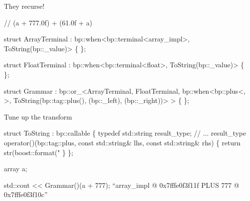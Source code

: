 
\begin{frame}[fragile]{They recurse!}
\begin{semiverbatim}\alert<1>{// (a + 777.0f) + (61.0f + a)}

struct \alert<2>{ArrayTerminal}
  : bp::when<bp::terminal<array_impl>, ToString(bp::_value)>
\{ \};

struct \alert<2>{FloatTerminal}
  : bp::when<bp::terminal<float>, ToString(bp::_value)>
\{ \};

struct \alert<4>{Grammar} :
  bp::or_<\alert<3>{ArrayTerminal},
          \alert<3>{FloatTerminal},
          bp::when<bp::plus<,
                            >,
                   \alert<5>{ToString(bp::tag::plus(),
                            (bp::_left),
                            (bp::_right))}>
     >
\{ \};
\end{semiverbatim}


\end{frame}


\begin{frame}[fragile]{Tune up the transform}
\begin{semiverbatim}
struct ToString : bp::callable
\{
  typedef std::string result_type;
  // ...
\alert<2>{  result_type operator()(bp::tag::plus, 
                         const std::string& lhs, 
                         const std::string& rhs)
  \{
    return str(boost::format("%
  \}}
\};

array a;

std::cout << \alert<3>{Grammar()(a + 777)};
``\alert<4>{array_impl @ 0x7fffe0f3f11f PLUS 777 @ 0x7fffe0f3f10c}''
\end{semiverbatim}
\end{frame}

